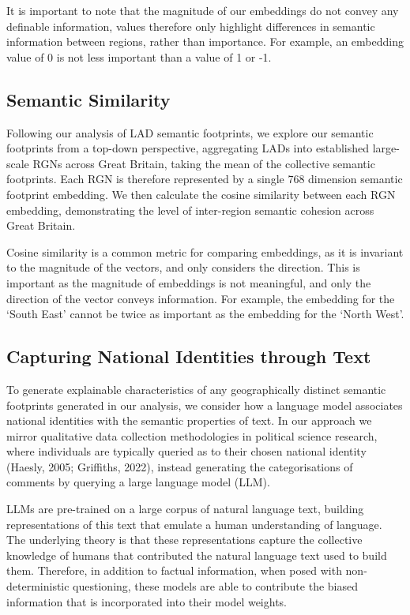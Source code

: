 \documentclass[
]{article}
\begin{document}
It is important to note that the magnitude of our embeddings do not
convey any definable information, values therefore only highlight
differences in semantic information between regions, rather than
importance. For example, an embedding value of 0 is not less important
than a value of 1 or -1.

\subsection{Semantic Similarity}\label{semantic-similarity}

Following our analysis of LAD semantic footprints, we explore our
semantic footprints from a top-down perspective, aggregating LADs into
established large-scale RGNs across Great Britain, taking the mean of
the collective semantic footprints. Each RGN is therefore represented by
a single 768 dimension semantic footprint embedding. We then calculate
the cosine similarity between each RGN embedding, demonstrating the
level of inter-region semantic cohesion across Great Britain.

Cosine similarity is a common metric for comparing embeddings, as it is
invariant to the magnitude of the vectors, and only considers the
direction. This is important as the magnitude of embeddings is not
meaningful, and only the direction of the vector conveys information.
For example, the embedding for the `South East' cannot be twice as
important as the embedding for the `North West'.

\subsection{Capturing National Identities through
Text}\label{capturing-national-identities-through-text}

To generate explainable characteristics of any geographically distinct
semantic footprints generated in our analysis, we consider how a
language model associates national identities with the semantic
properties of text. In our approach we mirror qualitative data
collection methodologies in political science research, where
individuals are typically queried as to their chosen national identity
(Haesly, 2005; Griffiths, 2022), instead generating the categorisations
of comments by querying a large language model (LLM).

LLMs are pre-trained on a large corpus of natural language text,
building representations of this text that emulate a human understanding
of language. The underlying theory is that these representations capture
the collective knowledge of humans that contributed the natural language
text used to build them. Therefore, in addition to factual information,
when posed with non-deterministic questioning, these models are able to
contribute the biased information that is incorporated into their model
weights.
\end{document}
